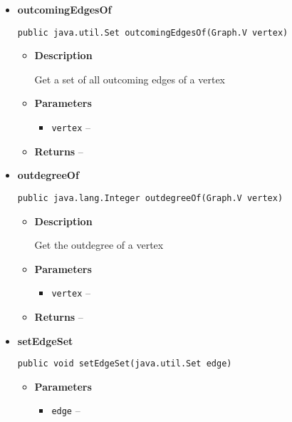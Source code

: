 {{{{{{{{{{{{{{\begin{itemize}
{\begin{itemize}
{}%
\end{itemize}
}%
\item{ 
{\bf  outcomingEdgesOf}\\
\begin{lstlisting}[frame=none]
public java.util.Set outcomingEdgesOf(Graph.V vertex)\end{lstlisting} %
\begin{itemize}
\item{
{\bf  Description}

Get a set of all outcoming edges of a vertex
}
\item{
{\bf  Parameters}
  \begin{itemize}
   \item{
\texttt{vertex} -- }
  \end{itemize}
}%
\item{{\bf  Returns} -- 
 
}%
\end{itemize}
}%
\item{ 
{\bf  outdegreeOf}\\
\begin{lstlisting}[frame=none]
public java.lang.Integer outdegreeOf(Graph.V vertex)\end{lstlisting} %
\begin{itemize}
\item{
{\bf  Description}

Get the outdegree of a vertex
}
\item{
{\bf  Parameters}
  \begin{itemize}
   \item{
\texttt{vertex} -- }
  \end{itemize}
}%
\item{{\bf  Returns} -- 
 
}%
\end{itemize}
}%
\item{ 
{\bf  setEdgeSet}\\
\begin{lstlisting}[frame=none]
public void setEdgeSet(java.util.Set edge)\end{lstlisting} %
\begin{itemize}
\item{
{\bf  Parameters}
  \begin{itemize}
   \item{
\texttt{edge} -- }
  \end{itemize}
}%
\end{itemize}
}%
\end{itemize}
}
}
}}}}}}}}}}}}
